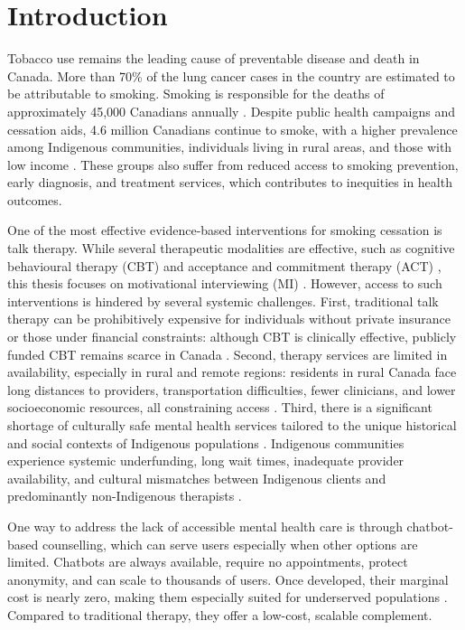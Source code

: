 \chapter{Introduction}

Tobacco use remains the leading cause of preventable disease and death in Canada. More
than 70\% of the lung cancer cases in the country are estimated to be attributable to
smoking. Smoking is responsible for the deaths of approximately 45,000 Canadians
annually \cite{poirier2019estimates}. Despite public health campaigns and cessation
aids, 4.6 million Canadians continue to smoke, with a higher prevalence among
Indigenous communities, individuals living in rural areas, and those with low income
\cite{cpac2020lung}. These groups also suffer from reduced access to smoking
prevention, early diagnosis, and treatment services, which contributes to inequities in
health outcomes.

One of the most effective evidence-based interventions for smoking cessation is talk
therapy. While several therapeutic modalities are effective, such as cognitive
behavioural therapy (CBT) \cite{beck2011cognitive} and acceptance and commitment
therapy (ACT) \cite{hayes1999acceptance}, this thesis focuses on motivational
interviewing (MI) \cite{MillerRollnick2023}. However, access to such interventions is
hindered by several systemic challenges. First, traditional talk therapy can be
prohibitively expensive for individuals without private insurance or those under
financial constraints: although CBT is clinically effective, publicly funded CBT
remains scarce in Canada
\cite{doi:10.1177/0253717620957496,doi:10.1177/0706743716642416}. Second, therapy
services are limited in availability, especially in rural and remote regions: residents
in rural Canada face long distances to providers, transportation difficulties, fewer
clinicians, and lower socioeconomic resources, all constraining access
\cite{burns2007rural,james2021improving}. Third, there is a significant shortage of
culturally safe mental health services tailored to the unique historical and social
contexts of Indigenous populations
\cite{josewski2023improving,hartwasekeesikaw2009cultural}. Indigenous communities
experience systemic underfunding, long wait times, inadequate provider availability,
and cultural mismatches between Indigenous clients and predominantly non-Indigenous
therapists \cite{turner2018poverty}.

One way to address the lack of accessible mental health care is through chatbot-based
counselling, which can serve users especially when other options are limited. Chatbots
are always available, require no appointments, protect anonymity, and can scale to
thousands of users. Once developed, their marginal cost is nearly zero, making them
especially suited for underserved populations
\cite{torous2017digital,miner2016smartphone}. Compared to traditional therapy, they
offer a low-cost, scalable complement.

